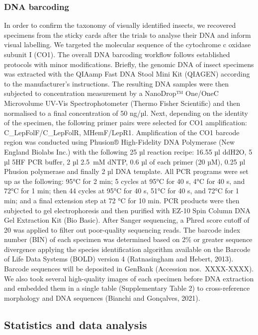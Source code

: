\documentclass[12pt]{article}
\begin{document}
\begin{linenumbers}
		\subsubsection*{DNA barcoding}
		In order to confirm the taxonomy of visually identified insects, we recovered specimens from the sticky cards after the trials to analyse their DNA and inform visual labelling. We targeted the molecular sequence of the cytochrome c oxidase subunit I (CO1). The overall DNA barcoding workflow follows established protocols\cite{dewaard_expedited_2018} with minor modifications. Briefly, the genomic DNA of insect specimens was extracted with the QIAamp Fast DNA Stool Mini Kit (QIAGEN) according to the manufacturer’s instructions. The resulting DNA samples were then subjected to concentration measurement by a NanoDrop™ One/OneC Microvolume UV-Vis Spectrophotometer (Thermo Fisher Scientific) and then normalised to a final concentration of 50 ng/µl. Next, depending on the identity of the specimen, the following primer pairs were selected for CO1 amplification: C\_LepFolF/C\_LepFolR\cite{hernandeztriana_recovery_2014}, MHemF/LepR1\cite{park_barcoding_2011}. Amplification of the CO1 barcode region was conducted using Phusion® High-Fidelity DNA Polymerase (New England Biolabs Inc.) with the following 25 µl reaction recipe: 16.55 µl ddH2O, 5 µl 5HF PCR buffer, 2 µl 2.5~mM dNTP, 0.6 µl of each primer (20 µM), 0.25 µl Phusion polymerase and finally 2 µl DNA template. All PCR programs were set up as the following: 95°C for 2 min; 5 cycles at 95°C for 40 s, 4°C for 40 s, and 72°C for 1 min; then 44 cycles at 95°C for 40 s, 51°C for 40 s, and 72°C for 1 min; and a final extension step at 72 °C for 10 min. PCR products were then subjected to gel electrophoresis and then purified with EZ-10 Spin Column DNA Gel Extraction Kit (Bio Basic). After Sanger sequencing, a Phred score cutoff of 20 was applied to filter out poor-quality sequencing reads. 
		The barcode index number (BIN) of each specimen was determined based on 2\% or greater sequence divergence applying the species identification algorithm available on the Barcode of Life Data Systems (BOLD) version 4 (Ratnasingham and Hebert, 2013). Barcode sequences will be deposited in GenBank (Accession nos.~XXXX-XXXX). We also took several high-quality images of each specimen before DNA extraction and embedded them in a single table (Supplementary Table 2) to cross-reference morphology and DNA sequences (Bianchi and Gonçalves, 2021).
		
		
		\subsection*{Statistics and data analysis}
		

\end{linenumbers}
\end{document}
